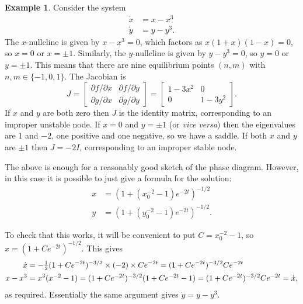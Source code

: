 \documentclass[reqno]{amsart}
\theoremstyle{definition}
\newtheorem{example}[theorem]{Example}
\begin{document}
\begin{example}\label{eg-gradient-flow}
 Consider the system
 \begin{align*}
  \dot{x} &= x-x^3 \\
  \dot{y} &= y-y^3.
 \end{align*}
 The $x$-nullcline is given by $x-x^3=0$, which factors as
 $x(1+x)(1-x)=0$, so $x=0$ or $x=\pm 1$.  Similarly, the $y$-nullcline
 is given by $y-y^3=0$, so $y=0$ or $y=\pm 1$.  This means that there
 are nine equilibrium points $(n,m)$ with $n,m\in\{-1,0,1\}$.  The
 Jacobian is 
 \[ J = \left[\begin{array}{cc} \partial f/\partial x & \partial f/\partial y \\
             \partial g/\partial x & \partial g/\partial y \end{array}\right]
      = \left[\begin{array}{cc} 1-3x^2 & 0 \\
             0 & 1-3y^2 \end{array}\right].
 \]
 If $x$ and $y$ are both zero then $J$ is the identity matrix,
 corresponding to an improper unstable node.  If $x=0$ and $y=\pm 1$
 (or \emph{vice versa}) then the eigenvalues are $1$ and $-2$, one
 positive and one negative, so we have a saddle.  If both $x$ and $y$
 are $\pm 1$ then $J=-2I$, corresponding to an improper stable node.

 The above is enough for a reasonably good sketch of the phase
 diagram.  However, in this case it is possible to just give a formula
 for the solution:
 \begin{align*}
  x &= (1+(x_0^{-2}-1)e^{-2t})^{-1/2} \\
  y &= (1+(y_0^{-2}-1)e^{-2t})^{-1/2}.  
 \end{align*}

 To check that this works, it will be convenient to put
 $C=x_0^{-2}-1$, so $x=(1+Ce^{-2t})^{-1/2}$.  This gives
 \begin{align*}
  \dot{x} &= -\tfrac{1}{2}(1+Ce^{-2t})^{-3/2}\times(-2)\times
              Ce^{-2t} 
           = (1+Ce^{-2t})^{-3/2}C e^{-2t} \\
  x-x^3 &= x^3(x^{-2}-1)
         = (1+Ce^{-2t})^{-3/2}(1+Ce^{-2t}-1) 
         = (1+Ce^{-2t})^{-3/2}C e^{-2t} = \dot{x},
 \end{align*}
 as required.  Essentially the same argument gives $\dot{y}=y-y^3$.


\end{example}
\end{document}
